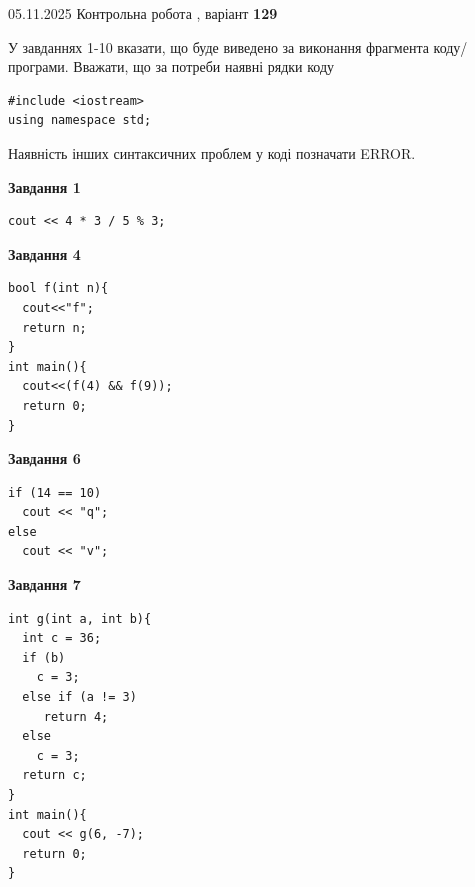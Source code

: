 \documentclass[12pt, ukrainian]{article}
\begin{document}
{\Large{05.11.2025 Контрольна робота , варіант  \No \textbf { 129 }\par}}
{
\begin {large}
У завданнях 1-10 вказати, що буде виведено за виконання фрагмента коду/про\-гра\-ми.
Вважати, що за потреби наявні рядки коду
\begin{verbatim}
#include <iostream>
using namespace std;
\end{verbatim}
Наявність інших синтаксичних проблем у коді позначати ERROR.

\begin{minipage}[t]{7.0cm}

\begin{center}
\textbf{Завдання 1}
\end{center}
\vspace{-8mm}

\begin{verbatim}
cout << 4 * 3 / 5 % 3;
\end{verbatim}



\begin{center}
\textbf{Завдання 4}
\end{center}
\vspace{-8mm}

\begin{verbatim}
bool f(int n){
  cout<<"f";
  return n;
}
int main(){
  cout<<(f(4) && f(9));
  return 0;
}
\end{verbatim}



\begin{center}
\textbf{Завдання 6}
\end{center}
\vspace{-8mm}

\begin{verbatim}
if (14 == 10)
  cout << "q";
else
  cout << "v";
\end{verbatim}



\begin{center}
\textbf{Завдання 7}
\end{center}
\vspace{-8mm}

\begin{verbatim}
int g(int a, int b){
  int c = 36;
  if (b)
    c = 3;
  else if (a != 3)
     return 4;
  else
    c = 3;
  return c;
}
int main(){
  cout << g(6, -7);
  return 0;
}
\end{verbatim}


\end{minipage}
\end{large}}
\end{document}
